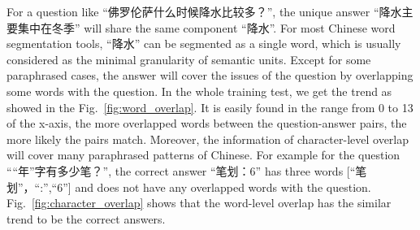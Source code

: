 \documentclass{llncs}
\begin{document}
For a question like ``佛罗伦萨什么时候降水比较多？'', the unique answer ``降水主要集中在冬季'' will share the same component ``降水''. {\color{red}For} most Chinese word segmentation tools, ``降水'' can be
segmented as a single word, which is usually considered as the minimal granularity of semantic units. Except for some paraphrased cases, the answer will cover the issues of the question by overlapping some words with the question. In the whole training test, we get the trend as showed in the Fig.~\ref{fig:word_overlap}. It is easily found in the range from 0 to 13 of the x-axis, the more overlapped words between the question-answer pairs, the more likely the pairs match. Moreover, the information of character-level overlap will cover many paraphrased patterns of Chinese. For example {\color{red}for} the question ``“年”字有多少笔？'', the correct answer ``笔划：6'' {\color{red}has} three words [``笔划''，``:'',``6''] and does not have any overlapped words with the question.  Fig.~\ref{fig:character_overlap} shows {\color{red}that} the word-level overlap has the similar trend to be the correct answers. 


\end{document}

